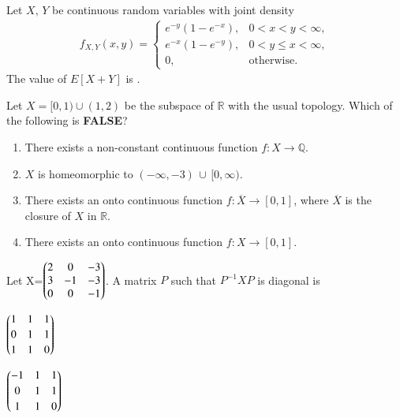 \documentclass[journal,12pt,onecolumn]{IEEEtran}
\theoremstyle{remark}
\begin{document}
\begin{enumerate}
{\hfill{}

\item Let $X,\,Y$ be continuous random variables with joint density
\begin{align*}
f_{X,Y}(x,y)=
\begin{cases}
e^{-y}\!\left(1-e^{-x}\right), & 0<x<y<\infty,\\[2pt]
e^{-x}\!\left(1-e^{-y}\right), & 0<y\le x<\infty,\\[2pt]
0, & \text{otherwise.}
\end{cases}
\end{align*}
The value of $E[X+Y]$ is \underline{\hspace{3.0cm}}.

\hfill{}

\item Let $X=[0,1)\cup(1,2)$ be the subspace of $\mathbb{R}$ with the usual topology.
Which of the following is \textbf{FALSE}?

\hfill{}

\begin{enumerate}
\item There exists a non\mbox{-}constant continuous function $f:X\to\mathbb{Q}$.
\item $X$ is homeomorphic to $(-\infty,-3)\,\cup\,[0,\infty)$.
\item There exists an onto continuous function $f:\overline{X}\to[0,1]$, where $\overline{X}$ is the closure of $X$ in $\mathbb{R}$.
\item There exists an onto continuous function $f:X\to[0,1]$.
\end{enumerate}

\newpage

\item Let
X=$\begin{pmatrix}2 & 0 & -3\\
3 & -1 & -3\\
0 & 0 & -1\end{pmatrix}$.
A matrix $P$ such that $P^{-1}XP$ is diagonal is \hfill{}

\begin{enumerate}
\begin{multicols}{2}

\item $\begin{pmatrix}1&1&1\\[2pt]0&1&1\\[2pt]1&1&0\end{pmatrix}$

\item $\begin{pmatrix}-1&1&1\\[2pt]0&1&1\\[2pt]1&1&0\end{pmatrix}$


\end{multicols}
\end{enumerate}}
\end{enumerate}
\end{document}
